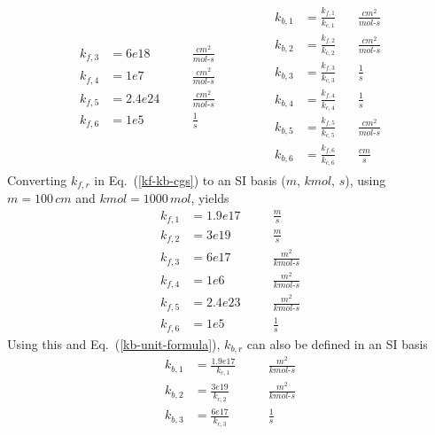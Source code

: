 \documentclass{report}
\newcommand{\eref}[1]{Eq.~(\ref{#1})}
\newcommand{\kf}[1]{k_{f,#1}}
\newcommand{\kb}[1]{k_{b,#1}}
\newcommand{\kc}[1]{k_{c,#1}}
\newcommand{\kcf}[1]{\frac{k_{f,#1}}{k_{c,#1}}}
\begin{document}
\begin{enumerate}[label=(\alph*)]
\begin{align}
\begin{alignedat}{2}
      \kf{3} &= 6e18   && \quad \frac{cm^2}{mol\text{-}s} \\
      \kf{4} &= 1e7    && \quad \frac{cm^2}{mol\text{-}s} \\
      \kf{5} &= 2.4e24 && \quad \frac{cm^2}{mol\text{-}s} \\
      \kf{6} &= 1e5    && \quad \frac{1}{s}
    \end{alignedat} \qquad\qquad
    \begin{alignedat}{2}
      \kb{1} &= \kcf{1} \, && \frac{cm^2}{mol\text{-}s} \\
      \kb{2} &= \kcf{2} \, && \frac{cm^2}{mol\text{-}s} \\
      \kb{3} &= \kcf{3} \, && \frac{1}{s} \\
      \kb{4} &= \kcf{4} \, && \frac{1}{s} \\
      \kb{5} &= \kcf{5} \, && \frac{cm^2}{mol\text{-}s} \\
      \kb{6} &= \kcf{6} \, && \frac{cm}{s}
    \end{alignedat}
    \label{kf-kb-cgs}
  \end{align}
  Converting $\kf{r}$ in \eref{kf-kb-cgs} to an SI basis ($m$, $kmol$, $s$),
  using $m = 100\, cm$ and $kmol = 1000\, mol$, yields
  \begin{equation}
    \boxed{\begin{alignedat}{2}
      \kf{1} &= 1.9e17 && \quad \frac{m}{s} \\
      \kf{2} &= 3e19   && \quad \frac{m}{s} \\
      \kf{3} &= 6e17   && \quad \frac{m^2}{kmol\text{-}s} \\
      \kf{4} &= 1e6    && \quad \frac{m^2}{kmol\text{-}s} \\
      \kf{5} &= 2.4e23 && \quad \frac{m^2}{kmol\text{-}s} \\
      \kf{6} &= 1e5    && \quad \frac{1}{s}
    \end{alignedat}}
  \end{equation}
  Using this and \eref{kb-unit-formula}, $\kb{r}$ can also be defined in an SI basis
  \begin{equation}
    \boxed{\begin{alignedat}{2}
      \kb{1} &= \frac{1.9e17 }{\kc{1}}
                \quad && \frac{m^2}{kmol\text{-}s} \\
      \kb{2} &= \frac{3e19   }{\kc{2}}
                \quad && \frac{m^2}{kmol\text{-}s} \\
      \kb{3} &= \frac{6e17   }{\kc{3}}
                \quad && \frac{1}{s} \\

\end{alignedat}}
\end{equation}
\end{enumerate}
\end{document}
